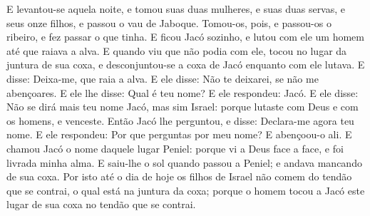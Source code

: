 {{E levantou-se aquela noite, e tomou suas duas mulheres, e suas duas servas, e seus onze filhos, e passou o vau de Jaboque.
Tomou-os, pois, e passou-os o ribeiro, e fez passar o que tinha.
E ficou Jacó sozinho, e lutou com ele um homem até que raiava a alva.
E quando viu que não podia com ele, tocou no lugar da juntura de sua coxa, e desconjuntou-se a coxa de Jacó enquanto com ele lutava.
E disse: Deixa-me, que raia a alva. E ele disse: Não te deixarei, se não me abençoares.
E ele lhe disse: Qual é teu nome? E ele respondeu: Jacó.
E ele disse: Não se dirá mais teu nome Jacó, mas sim Israel: porque lutaste com Deus e com os homens, e venceste.
Então Jacó lhe perguntou, e disse: Declara-me agora teu nome. E ele respondeu: Por que perguntas por meu nome? E abençoou-o ali.
E chamou Jacó o nome daquele lugar Peniel: porque vi a Deus face a face, e foi livrada minha alma.
E saiu-lhe o sol quando passou a Peniel; e andava mancando de sua coxa.
Por isto até o dia de hoje os filhos de Israel não comem do tendão que se contrai, o qual está na juntura da coxa; porque o homem tocou a Jacó este lugar de sua coxa no tendão que se contrai.

\par}

}
